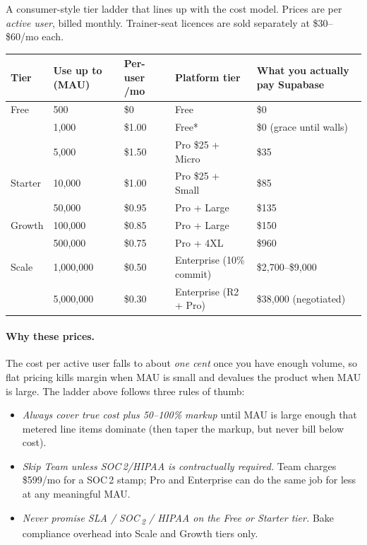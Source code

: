 \documentclass[11pt]{article}
\begin{document}
A consumer-style tier ladder that lines up with the cost model. Prices are per \textit{active user}, billed monthly. Trainer-seat licences are sold separately at \$30--\$60/mo each.

\begin{table}[H]\centering\scriptsize
\begin{tabular}{l l l l l}
\toprule
\textbf{Tier} & \textbf{Use up to (MAU)} & \textbf{Per-user /mo} & \textbf{Platform tier} & \textbf{What you actually pay Supabase} \\
\midrule
\rowcolor{gray!10}
Free           & 500        & \$0     & Free               & \$0                      \\
                & 1{,}000    & \$1.00  & Free*              & \$0 (grace until walls)  \\
                & 5{,}000    & \$1.50  & Pro \$25 + Micro   & \$35                     \\
\rowcolor{gray!10}
Starter        & 10{,}000   & \$1.00  & Pro \$25 + Small   & \$85                     \\
                & 50{,}000   & \$0.95  & Pro + Large        & \$135                    \\
\rowcolor{gray!10}
Growth         & 100{,}000  & \$0.85  & Pro + Large        & \$150                    \\
                & 500{,}000  & \$0.75  & Pro + 4XL          & \$960                    \\
\rowcolor{gray!10}
Scale          & 1{,}000{,}000 & \$0.50  & Enterprise (10\% commit) & \$2{,}700--\$9{,}000 \\
                & 5{,}000{,}000 & \$0.30  & Enterprise (R2 + Pro)     & \$38{,}000 (negotiated) \\
\bottomrule
\end{tabular}
\end{table}

\paragraph{Why these prices.} The cost per active user falls to about \emph{one cent} once you have enough volume, so flat pricing kills margin when MAU is small and devalues the product when MAU is large. The ladder above follows three rules of thumb:

\begin{itemize}[leftmargin=*,itemsep=2pt]
\item \emph{Always cover true cost plus 50--100\% markup} until MAU is large enough that metered line items dominate (then taper the markup, but never bill below cost).
\item \emph{Skip Team unless SOC\,2/HIPAA is contractually required.} Team charges \$599/mo for a SOC\,2 stamp; Pro and Enterprise can do the same job for less at any meaningful MAU.
\item \emph{Never promise SLA / SOC\,\textsubscript{2} / HIPAA on the Free or Starter tier.} Bake compliance overhead into Scale and Growth tiers only.
\end{itemize}
\end{document}
